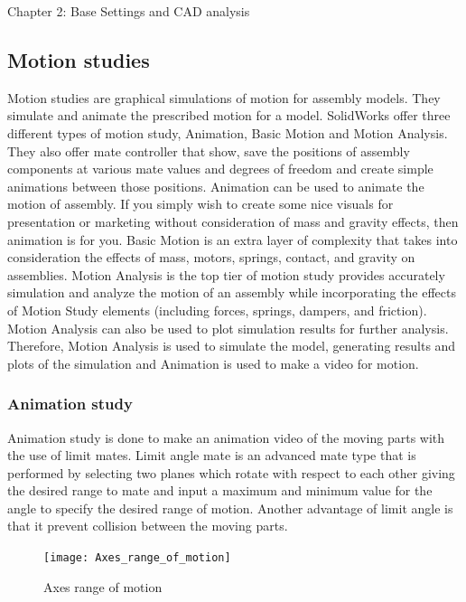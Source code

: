 \documentclass{book}
\begin{document}
\begin{chapter}{Chapter 2: Base Settings and CAD analysis}
\subsection{Motion studies}
Motion studies are graphical simulations of motion for assembly models. They simulate and animate the prescribed motion for a model. SolidWorks offer three different types of motion study, Animation, Basic Motion and Motion Analysis. They also offer mate controller that show, save the positions of assembly components at various mate values and degrees of freedom and create simple animations between those positions.
\smallskip
\newline Animation can be used to animate the motion of assembly. If you simply wish to create some nice visuals for presentation or marketing without consideration of mass and gravity effects, then animation is for you. 
\newline Basic Motion is an extra layer of complexity that takes into consideration the effects of mass, motors, springs, contact, and gravity on assemblies. 
\smallskip
\newline Motion Analysis is the top tier of motion study provides accurately simulation and analyze the motion of an assembly while incorporating the effects of Motion Study elements (including forces, springs, dampers, and friction). Motion Analysis can also be used to plot simulation results for further analysis.
\smallskip
\newline Therefore, Motion Analysis is used to simulate the model, generating results and plots of the simulation and Animation is used to make a video for motion.

\bigskip
\subsubsection{Animation study} 
Animation study is done to make an animation video of the moving parts with the use of limit mates. Limit angle mate is an advanced mate type that is performed by selecting two planes which rotate with respect to each other giving the desired range to mate and input a maximum and minimum value for the angle to specify the desired range of motion. Another advantage of limit angle is that it prevent collision between the moving parts.

\begin{figure}[H]
	\centering
	\texttt{[image: Axes\_range\_of\_motion]}
	\caption{Axes range of motion}
\end{figure}


\end{chapter}
\end{document}
